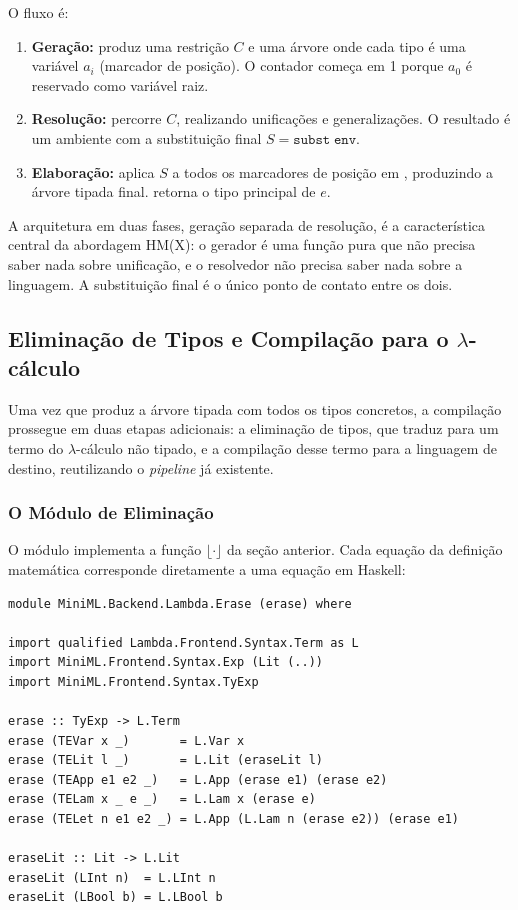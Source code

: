   O fluxo é:

  \begin{enumerate}
    \item
      \textbf{Geração:} 
      produz uma restrição \(C\) e uma árvore
       onde cada tipo é uma variável
      \(a_i\) (marcador de posição). O contador começa em 1 porque
      \(a_0\) é reservado como variável raiz.
    \item
      \textbf{Resolução:}  percorre
      \(C\), realizando unificações e generalizações. O resultado é um
      ambiente  com a substituição final
      \(S = \mathtt{subst\; env}\).
    \item
      \textbf{Elaboração:}  aplica
      \(S\) a todos os marcadores de posição em
      , produzindo a árvore tipada final.
       retorna o tipo principal de \(e\).
  \end{enumerate}

  A arquitetura em duas fases, geração separada de resolução, é a
  característica central da abordagem HM(X): o gerador é uma função
  pura que não precisa saber nada sobre unificação, e o resolvedor não
  precisa saber nada sobre a linguagem. A substituição final é o único
  ponto de contato entre os dois.

  \subsection{Eliminação de Tipos e Compilação para o $\lambda$-cálculo}

  Uma vez que  produz a árvore tipada
   com todos os tipos concretos, a compilação
  prossegue em duas etapas adicionais: a eliminação de tipos, que
  traduz  para um termo do $\lambda$-cálculo não tipado, e a
  compilação desse termo para a linguagem de destino, reutilizando o
  \emph{pipeline} já existente.

  \subsubsection{O Módulo de Eliminação}

  O módulo  implementa a função
  \(\lfloor \cdot \rfloor\) da seção anterior. Cada equação da definição
  matemática corresponde diretamente a uma equação em Haskell:

\begin{verbatim}
module MiniML.Backend.Lambda.Erase (erase) where

import qualified Lambda.Frontend.Syntax.Term as L
import MiniML.Frontend.Syntax.Exp (Lit (..))
import MiniML.Frontend.Syntax.TyExp

erase :: TyExp -> L.Term
erase (TEVar x _)       = L.Var x
erase (TELit l _)       = L.Lit (eraseLit l)
erase (TEApp e1 e2 _)   = L.App (erase e1) (erase e2)
erase (TELam x _ e _)   = L.Lam x (erase e)
erase (TELet n e1 e2 _) = L.App (L.Lam n (erase e2)) (erase e1)

eraseLit :: Lit -> L.Lit
eraseLit (LInt n)  = L.LInt n
eraseLit (LBool b) = L.LBool b
\end{verbatim}

